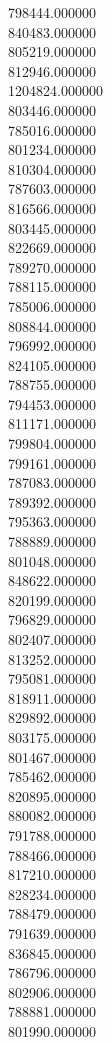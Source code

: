 798444.000000\\
840483.000000\\
805219.000000\\
812946.000000\\
1204824.000000\\
803446.000000\\
785016.000000\\
801234.000000\\
810304.000000\\
787603.000000\\
816566.000000\\
803445.000000\\
822669.000000\\
789270.000000\\
788115.000000\\
785006.000000\\
808844.000000\\
796992.000000\\
824105.000000\\
788755.000000\\
794453.000000\\
811171.000000\\
799804.000000\\
799161.000000\\
787083.000000\\
789392.000000\\
795363.000000\\
788889.000000\\
801048.000000\\
848622.000000\\
820199.000000\\
796829.000000\\
802407.000000\\
813252.000000\\
795081.000000\\
818911.000000\\
829892.000000\\
803175.000000\\
801467.000000\\
785462.000000\\
820895.000000\\
880082.000000\\
791788.000000\\
788466.000000\\
817210.000000\\
828234.000000\\
788479.000000\\
791639.000000\\
836845.000000\\
786796.000000\\
802906.000000\\
788881.000000\\
801990.000000\\

